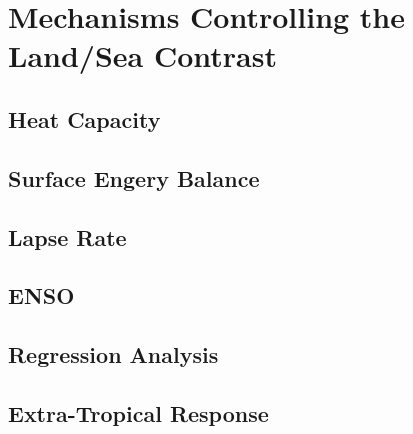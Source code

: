 \chapter{Mechanisms Controlling the Land/Sea Contrast} 

\label{mechanisms} 



\section{Heat Capacity}


\section{Surface Engery Balance}


\section{Lapse Rate}



\section{ENSO}




\section{Regression Analysis}



\section{Extra-Tropical Response}

